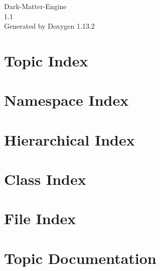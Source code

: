 \documentclass[twoside]{book}
\newcommand{\+}{\discretionary{\mbox{\scriptsize$\hookleftarrow$}}{}{}}
\newcommand{\clearemptydoublepage}{%
    \newpage{\pagestyle{empty}\cleardoublepage}%
  }
\begin{document}
  \raggedbottom
    \hypersetup{pageanchor=false,
                bookmarksnumbered=true,
                pdfencoding=unicode
               }
  \begin{titlepage}
  \vspace*{7cm}
  \begin{center}%
  {\Large Dark-\/\+Matter-\/\+Engine}\\
  [1ex]\large 1.\+1 \\
  \vspace*{1cm}
  {\large Generated by Doxygen 1.13.2}\\
  \end{center}
  \end{titlepage}
  \clearemptydoublepage
  \tableofcontents
  \clearemptydoublepage
  \hypersetup{pageanchor=true}



\chapter{Topic Index}

\chapter{Namespace Index}

\chapter{Hierarchical Index}

\chapter{Class Index}

\chapter{File Index}

\chapter{Topic Documentation}













\end{document}
